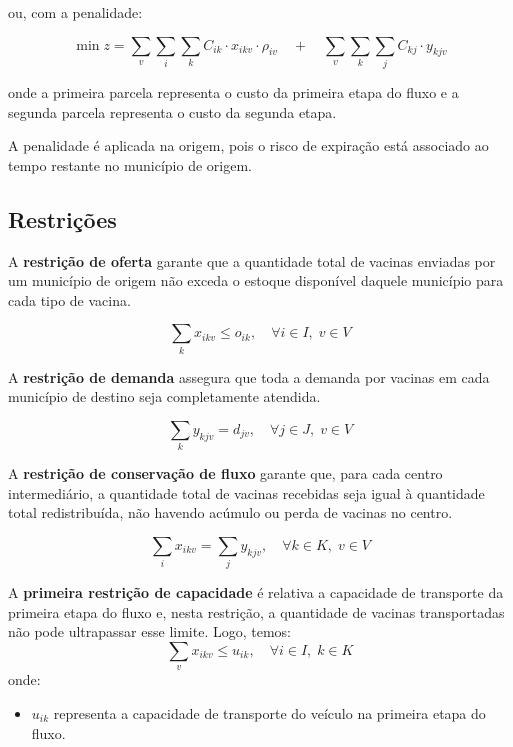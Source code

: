 ou, com a penalidade:

\begin{equation}
    \min z = \sum_{v} \sum_{i} \sum_{k} C_{ik} \cdot x_{ikv} \cdot \rho_{iv} \quad + \quad \sum_{v} \sum_{k} \sum_{j} C_{kj} \cdot y_{kjv}
    \label{eq:intermunicipal_estendido}
\end{equation}

onde a primeira parcela representa o custo da primeira etapa do fluxo e a segunda parcela representa o custo da segunda etapa.

A penalidade é aplicada na origem, pois o risco de expiração está associado ao tempo restante no município de origem.

\subsection{Restrições}

A \textbf{restrição de oferta} garante que a quantidade total de vacinas enviadas por um município de origem não exceda o estoque disponível daquele município para cada tipo de vacina.

\begin{equation*}
\sum_{k} x_{ikv} \le o_{ik}, \quad \forall i \in I,\; v \in V
\end{equation*}

A \textbf{restrição de demanda} assegura que toda a demanda por vacinas em cada município de destino seja completamente atendida.

\begin{equation*}
\sum_{k} y_{kjv} = d_{jv}, \quad \forall j \in J, \; v \in V
\end{equation*}

A \textbf{restrição de conservação de fluxo} garante que, para cada centro intermediário, a quantidade total de vacinas recebidas seja igual à quantidade total redistribuída, não havendo acúmulo ou perda de vacinas no centro.

\begin{equation*}
\sum_{i} x_{ikv} = \sum_{j} y_{kjv}, \quad \forall k \in K,\; v \in V
\end{equation*}

A \textbf{primeira restrição de capacidade} é relativa a capacidade de transporte da primeira etapa do fluxo e, nesta restrição, a quantidade de vacinas transportadas não pode ultrapassar esse limite. Logo, temos:
\begin{equation*}
\sum_{v} x_{ikv} \le u_{ik}, \quad \forall i \in I, \; k \in K
\end{equation*}
onde:
\begin{itemize}
    \item $u_{ik}$ representa a capacidade de transporte do veículo na primeira etapa do fluxo.
\end{itemize}

